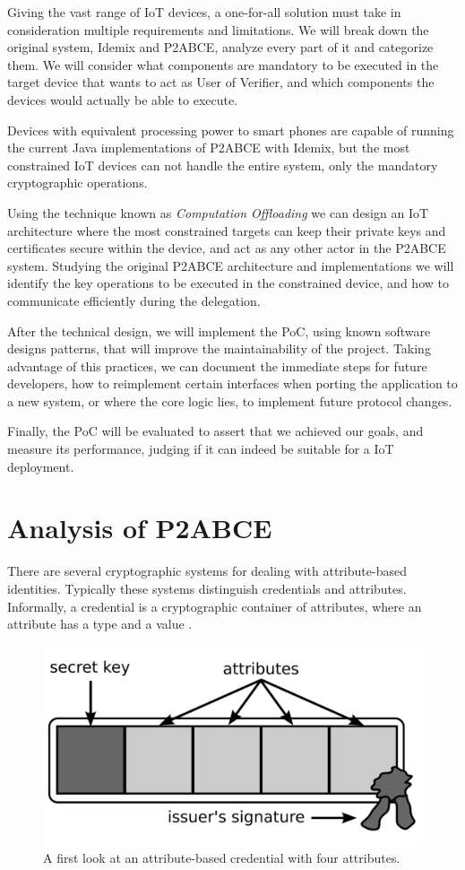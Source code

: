 Giving the vast range of IoT devices, a one-for-all solution must take in consideration multiple requirements and limitations. We will break down the original system, Idemix and P2ABCE, analyze every part of it and categorize them. We will consider what components are mandatory to be executed in the target device that wants to act as User of Verifier, and which components the devices would actually be able to execute.

Devices with equivalent processing power to smart phones are capable of running the current Java implementations of P2ABCE with Idemix, but the most constrained IoT devices can not handle the entire system, only the mandatory cryptographic operations.

Using the technique known as \textit{Computation Offloading} we can design an IoT architecture where the most constrained targets can keep their private keys and certificates secure within the device, and act as any other actor in the P2ABCE system. Studying the original P2ABCE architecture and implementations we will identify the key operations to be executed in the constrained device, and how to communicate efficiently during the delegation.

After the technical design, we will implement the PoC, using known software designs patterns, that will improve the maintainability of the project. Taking advantage of this practices, we can document the immediate steps for future developers, how to reimplement certain interfaces when porting the application to a new system, or where the core logic lies, to implement future protocol changes.

Finally, the PoC will be evaluated to assert that we achieved our goals, and measure its performance, judging if it can indeed be suitable for a IoT deployment.



\section{Analysis of P2ABCE}\label{analysisP2ABCE}

There are several cryptographic systems for dealing with attribute-based
identities. Typically these systems distinguish credentials and attributes. Informally,
a credential is a cryptographic container of attributes, where an attribute has a type and a value \citep{vullers2013efficient}.

\begin{figure}[bth]
	\begin{center}
		\includegraphics[width=0.4\linewidth]{gfx/ABC}
	\end{center}
	\caption{A first look at an attribute-based credential with four attributes.}
	\label{fig:abc}
\end{figure}



